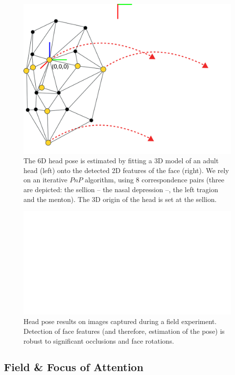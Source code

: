 \documentclass{sig-alternate}
\begin{document}
\begin{figure}[t]
    \centering
    \includegraphics[width=0.9\linewidth]{head_pose}
    \caption{The 6D head pose is estimated by fitting a 3D model of an
        adult head (left) onto the detected 2D features of the face (right). We
        rely on an iterative $PnP$ algorithm, using 8 correspondence pairs
        (three are depicted: the sellion -- the nasal depression --, the left
        tragion and the menton). The 3D origin of the head is set at the sellion.}
\label{head_pose}
\end{figure}

\begin{figure}[t]
    \centering
    \includegraphics[width=\linewidth]{head_pose_real_world}
    \caption{Head pose results on images captured during a field experiment.
    Detection of face features (and therefore, estimation of the pose) is robust
    to significant occlusions and face rotations.}
\label{head_pose_real_world}
\end{figure}

\subsection{Field \& Focus of Attention}
\end{document}
